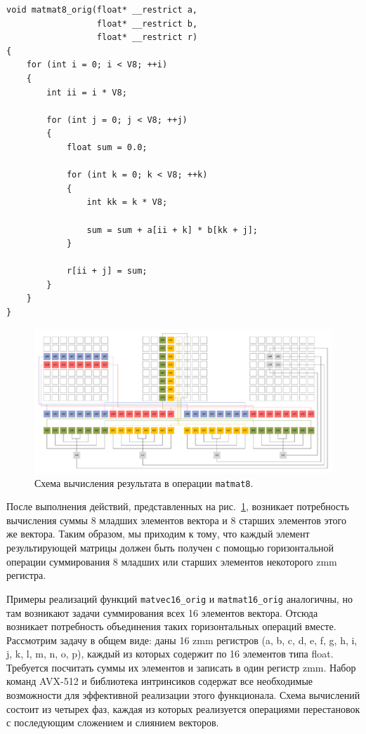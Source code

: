 \begin{singlespace}
\begin{lstlisting}[caption={Невекторизованная версия перемножения матриц \\ размера $8 \times 8$.}, label={lst:text_4_small_matr_8x8_mul_matr_noopt}]
void matmat8_orig(float* __restrict a,
                  float* __restrict b,
                  float* __restrict r)
{
    for (int i = 0; i < V8; ++i)
    {
        int ii = i * V8;
 
        for (int j = 0; j < V8; ++j)
        {
            float sum = 0.0;

            for (int k = 0; k < V8; ++k)
            {
                int kk = k * V8;
                
                sum = sum + a[ii + k] * b[kk + j];
            }

            r[ii + j] = sum;
        }
    }
}
\end{lstlisting}
\end{singlespace}

\begin{figure}[ht]
\centering
\includegraphics[width=1.00\textwidth]{./fig/vec_matmat8.pdf}
\singlespacing
{}\caption{Схема вычисления результата в операции \texttt{matmat8}.}
\label{fig:text_4_small_matr_matmat8}
\end{figure}

После выполнения действий, представленных на рис.~\ref{fig:text_4_small_matr_matmat8}, возникает потребность вычисления суммы 8 младших элементов вектора и 8 старших элементов этого же вектора.
Таким образом, мы приходим к тому, что каждый элемент результирующей матрицы должен быть получен с помощью горизонтальной операции суммирования 8 младших или старших элементов некоторого zmm регистра.

Примеры реализаций функций \texttt{matvec16\_orig} и \texttt{matmat16\_orig} аналогичны, но там возникают задачи суммирования всех 16 элементов вектора.
Отсюда возникает потребность объединения таких горизонтальных операций вместе.
Рассмотрим задачу в общем виде: даны 16 zmm регистров (a, b, c, d, e, f, g, h, i, j, k, l, m, n, o, p), каждый из которых содержит по 16 элементов типа float.
Требуется посчитать суммы их элементов и записать в один регистр zmm.
Набор команд AVX-512\label{abbr:avx-7} и библиотека интринсиков содержат все необходимые возможности для эффективной реализации этого функционала.
Схема вычислений состоит из четырех фаз, каждая из которых реализуется операциями перестановок с последующим сложением и слиянием векторов.

